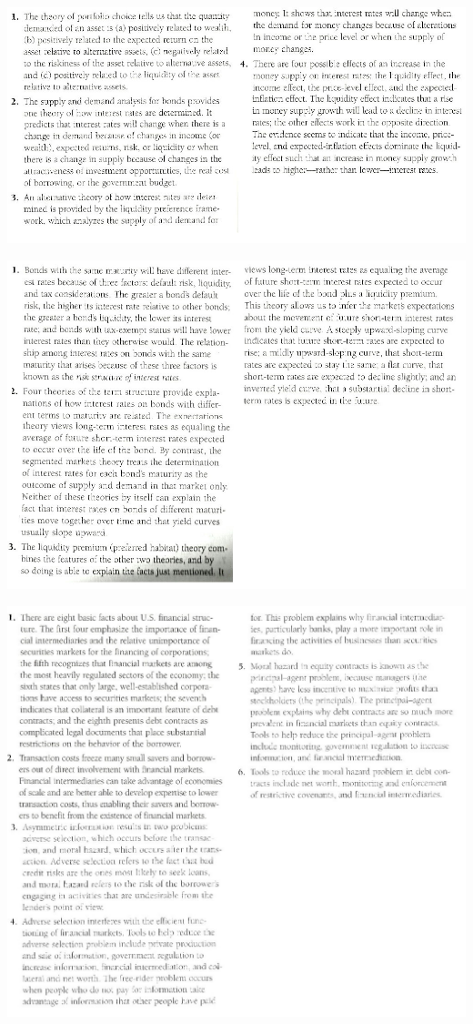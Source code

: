 \documentclass[12pt]{examnotes}
\begin{document}
\includegraphics[scale=0.5]{./imgs/5sum.jpg}

\includegraphics[scale=0.5]{./imgs/6sum.jpg}

\includegraphics[scale=0.5]{./imgs/8sum.jpg}
\end{document}
